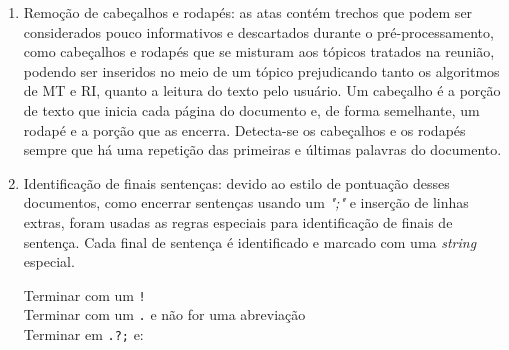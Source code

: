 \begin{enumerate}

\item Remoção de cabeçalhos e rodapés: as atas contém trechos que podem ser considerados pouco informativos e descartados durante o pré-processamento, como cabeçalhos e rodapés que se misturam aos tópicos tratados na reunião, podendo ser inseridos no meio de um tópico prejudicando tanto os algoritmos de MT e RI, quanto a leitura do texto pelo usuário. Um cabeçalho é a porção de texto que inicia cada página do documento e, de forma semelhante, um rodapé e a porção que as encerra. Detecta-se os cabeçalhos e os rodapés sempre que há uma repetição das primeiras e últimas palavras do documento.


\item Identificação de finais sentenças: devido ao estilo de pontuação desses documentos, como encerrar sentenças usando um \textit{";"} e inserção de linhas extras, foram usadas as regras especiais para identificação de finais de sentença. Cada final de sentença é identificado e marcado com uma \textit{string} especial.%



\begin{algorithm}

	
	
	 {	

	Terminar com um \texttt{!}\\
	Terminar com um \texttt{.} e não for uma abreviação\\
	Terminar em \texttt{.?;} e:
	}
	

\end{algorithm}
\end{enumerate}
